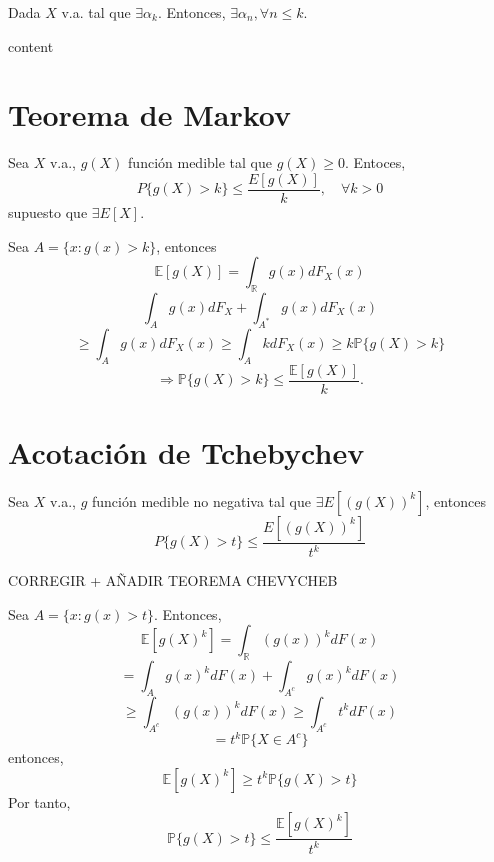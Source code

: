 \begin{prop}
  Dada $X$ v.a. tal que $\exists \alpha_{k}$. Entonces, $\exists \alpha_{n}, \forall n \leq k$.
\end{prop}

\begin{dem}
  content
\end{dem}

\section{Teorema de Markov}

\begin{theo}[Markov]
  Sea $X$ v.a., $g(X)$ función medible tal que $g(X) \geq 0$. Entoces,
  \[ 
    P \{ g(X) > k \} \leq \frac{E[g(X)]}{k}, \quad \forall k > 0 
  \] 
  supuesto que $\exists E[X]$.
\end{theo}

\begin{dem}
  Sea $A = \{ x : g(x) > k \}$, entonces
  \[ 
    \mathbb{E} [ g(X) ] = \int_{\mathbb{R}}^{} g(x) dF_{X}(x)
  \] 
  \[ 
    \int_{A}^{} g(x) dF_{X} + \int_{A^{*}}^{} g(x) dF_{X}(x)
  \] 
  \[ 
    \geq \int_{A}^{} g(x) dF_{X}(x) \geq \int_{A}^{} k dF_{X}(x) \geq k \mathbb{P} \{ g(X) > k \} 
  \] 
  \[ 
    \Rightarrow \mathbb{P} \{ g(X) > k \} \leq \frac{\mathbb{E} [ g(X) ]}{k}.
  \] 
\end{dem}

\section{Acotación de Tchebychev}

\begin{prop}
  Sea $X$ v.a., $g$ función medible no negativa tal que $\exists E[(g(X))^{k}]$, entonces
  \[ 
    P \{ g(X) > t \} \leq \frac{E[(g(X))^{k}]}{t^{k}} 
  \] 
\end{prop}
CORREGIR + AÑADIR TEOREMA CHEVYCHEB

\begin{dem}
  Sea $A = \{ x : g(x) > t \}$. Entonces,
  \[ 
    \mathbb{E} [ g(X)^{k} ] = \int_{\mathbb{R}}^{} (g(x))^{k} dF(x)
  \] 
  \[ 
    = \int_{A}^{} g(x)^{k} dF(x) + \int_{A^{c}}^{} g(x)^{k} dF(x)
  \] 
  \[ 
    \geq \int_{A^{c}}^{} (g(x))^{k} dF(x) \geq \int_{A^{c}}^{} t^{k} dF(x)
  \] 
  \[ 
    = t^{k} \mathbb{P} \{ X \in A^{c} \} 
  \] 
  entonces,
  \[ 
    \mathbb{E} [ g(X)^{k} ] \geq t^{k} \mathbb{P} \{ g(X) > t \} 
  \] 
  Por tanto,
  \[ 
    \mathbb{P} \{ g(X) > t \} \leq \frac{\mathbb{E} [ g(X)^{k} ]}{t^{k}}
  \] 
\end{dem}

